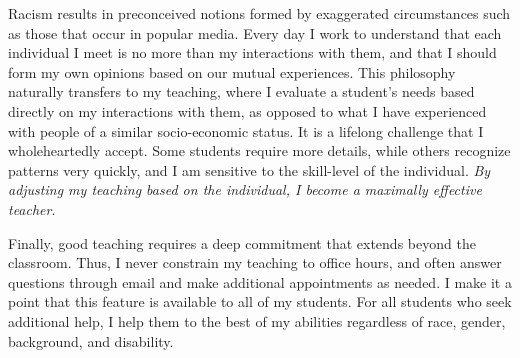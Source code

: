 \documentclass[a4paper,11pt]{article}
\begin{document}
Racism results in preconceived notions formed by exaggerated circumstances such as those that occur in popular media. Every day I work to understand that each individual I meet is no more than my interactions with them, and that I should form my own opinions based on our mutual experiences. This philosophy naturally transfers to my teaching, where I evaluate a student's needs based directly on my interactions with them, as opposed to what I have experienced with people of a similar socio-economic status. It is a lifelong challenge that I wholeheartedly accept. Some students require more details, while others recognize patterns very quickly, and I am sensitive to the skill-level of the individual. \textit{By adjusting my teaching based on the individual, I become a maximally effective teacher}.

Finally, good teaching requires a deep commitment that extends beyond the classroom. Thus, I never constrain my teaching to office hours, and often answer questions through email and make additional appointments as needed. I make it a point that this feature is available to all of my students. For all students who seek additional help, I help them to the best of my abilities regardless of race, gender, background, and disability.
\end{document}
